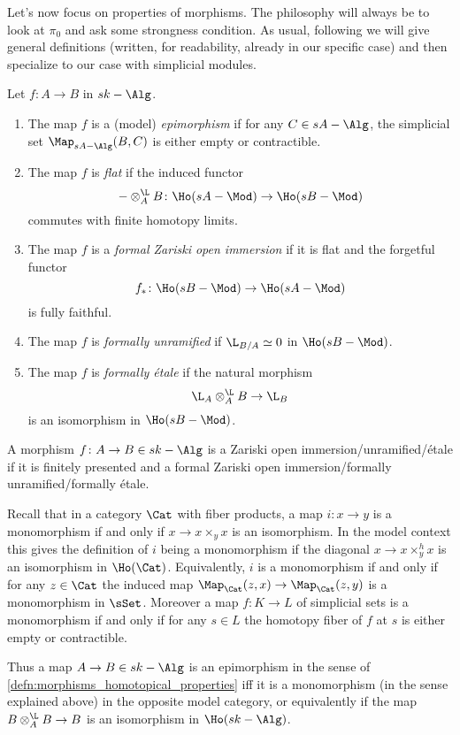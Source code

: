         Let's now focus on properties of morphisms. The philosophy will always be to look at $\pi_0$ and ask some strongness condition. 
        As usual, following \cite{ToVe:hag2} we will give general definitions (written, for readability, already in our specific case) and then specialize to our case with simplicial modules.
        \begin{defn}
            \label{defn:morphisms_homotopical_properties}
            Let $f\colon A \to B$ in $sk-\Alg$.
            \begin{enumerate}
                \item The map $f$ is a (model) \emph{epimorphism} if for any $C \in sA-\Alg$, the simplicial set $\Map_{sA-\Alg}(B, C)$ is either empty or contractible.
                \item The map $f$ is \emph{flat} if the induced functor \[- \otimes_A^{\L} B\colon \Ho(sA-\Mod) \to \Ho(sB-\Mod) \] commutes with finite homotopy limits.
                \item The map $f$ is a \emph{formal Zariski open immersion} if it is flat and the forgetful functor \[f_*\colon \Ho(sB-\Mod) \to \Ho(sA-\Mod) \] is fully faithful.
                \item The map $f$ is \emph{formally unramified} if $\L_{B/A} \simeq 0$ in $\Ho(sB-\Mod)$.
                \item The map $f$ is \emph{formally étale} if the natural morphism \[\L_A \otimes_A^{\L} B \to \L_B \] is an isomorphism in $\Ho(sB-\Mod)$.
            \end{enumerate}
        \end{defn}
        \begin{defn}
            \label{defn:morphisms_no_formally}
            A morphism $f\colon A \to B \in sk-\Alg$ is a Zariski open immersion/unramified/étale if it is finitely presented and a formal Zariski open immersion/formally unramified/formally étale.
        \end{defn}
        \begin{remark}
            \label{remark:monomorphisms}
            Recall that in a category $\Cat$ with fiber products, a map $i\colon x \to y$ is a monomorphism if and only if $x \to x \times_y x$ is an isomorphism. In the model context this gives the definition of $i$ being a monomorphism if the diagonal $x \to x \times_y^h x$ is an isomorphism in $\Ho(\Cat)$. Equivalently, $i$ is a monomorphism if and only if for any $z \in \Cat$ the induced map $\Map_{\Cat}(z, x) \to \Map_{\Cat}(z, y)$ is a monomorphism in $\sSet$. Moreover a map $f\colon K \to L$ of simplicial sets is a monomorphism if and only if for any $s \in L$ the homotopy fiber of $f$ at $s$ is either empty or contractible.

            Thus a map $A \to B \in sk-\Alg$ is an epimorphism in the sense of \cref{defn:morphisms_homotopical_properties} iff it is a monomorphism (in the sense explained above) in the opposite model category, or equivalently if the map $B \otimes^{\L}_A B \to B$ is an isomorphism in $\Ho(sk-\Alg)$.
        \end{remark}
